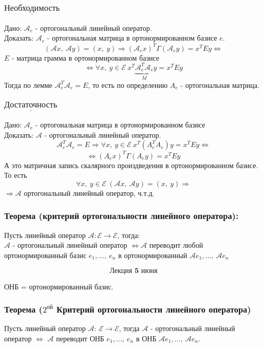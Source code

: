 \documentclass[12pt, letterpaper, twoside]{article}
\newcommand{\Underl}[1]{$\underline{\text{#1}}$}
\begin{document}
    \subsubsection*{\Underl{Необходимость}}
    Дано: $\mathcal{A}_e$ - ортогональный линейный оператор.\\
    Доказать: $\mathcal{A}_e$ - ортогональная матрица в ортонормированном базисе $e$.
    \[(\mathcal{A} x,\ \mathcal{A} y) = (x,\ y)\Rightarrow (\mathcal{A}_e x)^T \Gamma (\mathcal{A}_e y) = x^T E y\Leftrightarrow\]
    $E$ - матрица грамма в ортонормированном базисе
    \[\Leftrightarrow \forall x,\ y\in \mathcal{E}\ x^T \underset{M}{\underbrace{\mathcal{A}_e^T \mathcal{A}_e}}y = x^T E y\]
    Тогда по лемме $\mathcal{A}_e^T \mathcal{A}_e = E$, то есть по определению $A_e$ - ортогональная матрица.
    \subsubsection*{\Underl{Достаточность}}
    Дано: $\mathcal{A}_e$ - ортогональная матрица в ортонормированном базисе\\
    Доказать: $\mathcal{A}$ - ортогональный линейный оператор.
    \[\mathcal{A}_e^T \mathcal{A}_e = E\Rightarrow \forall x,\ y\in \mathcal{E}\ x^T (A_e^T A_e)y = x^T E y\Leftrightarrow\]
    \[\Leftrightarrow (A_e x)^T \Gamma (A_e y) = x^T E y\]
    А это матричная запись скалярного произдведения в ортонормированном базисе. То есть
    \[\forall x,\ y\in \mathcal{E}\ (\mathcal{A} x,\ \mathcal{A} y) = (x,\ y)\Rightarrow\]
    $\Rightarrow \mathcal{A}$ ортогональный линейный оператор, ч.т.д.
    \subsubsection*{Теорема (критерий ортогональности линейного оператора):}
    Пусть линейный оператор $\mathcal{A}: \mathcal{E}\longrightarrow \mathcal{E}$, тогда:\\
    $\mathcal{A}$ - ортогональный линейный оператор $\Leftrightarrow \mathcal{A}$ переводит любой ортонормированный базис $e_1,\dots,\ e_n$ в ортонормированный $\mathcal{A} e_1,\dots,\ \mathcal{A} e_n$ 

\[\textbf{Лекция 5 июня}\]

    ОНБ = ортонормированный базис.
    \subsubsection*{Теорема ($2^{\text{ой}}$ Критерий ортогональности линейного оператора)}
    Пусть линейный оператор $\mathcal{A}:\ \mathcal{E} \longrightarrow \mathcal{E}$, тогда $\mathcal{A}$ - ортогональный линейный оператор $\Leftrightarrow$ $\mathcal{A}$ переводит ОНБ $e_1,\dots,\ e_n$ в ОНБ $\mathcal{A}e_1,\dots,\ \mathcal{A}e_n$.
    
\end{document}
